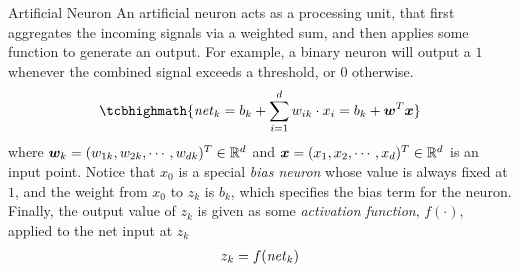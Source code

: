 \begin{frame}{Artificial Neuron}
An artificial neuron acts as a processing unit, that first aggregates the
incoming signals via a weighted sum, and then applies some function to
generate an output. For example, a binary neuron will output a $1$ whenever
the combined signal exceeds a threshold, or $0$ otherwise.
%
\begin{align}
    \tcbhighmath{
    \net_k = b_k + \sum^{d}_{i=1} w_{ik} \cdot x_i = b_k +
\bw^T\bx}
\end{align}
where ${\boldsymbol w}_k = (w_{1k}, w_{2k}, \cdots, w_{dk})^T \in {\mathord{\mathbb R}}^d$ and ${\boldsymbol x}
= (x_1, x_2, \cdots, x_d)^T \in {\mathord{\mathbb R}}^d$ is an input point. 
Notice that $x_0$ is a
special {\em bias neuron} whose value is always fixed at $1$, and the
weight from $x_0$ to $z_k$ is $b_k$, which specifies the bias term
for the neuron. Finally, the output value of $z_k$ is given as some {\em
    activation function}, $f(\cdot)$, applied to the net input at $z_k$
\begin{align*}
    z_k = f(\mathit{net}_k)
\end{align*}
\end{frame}
%
%
